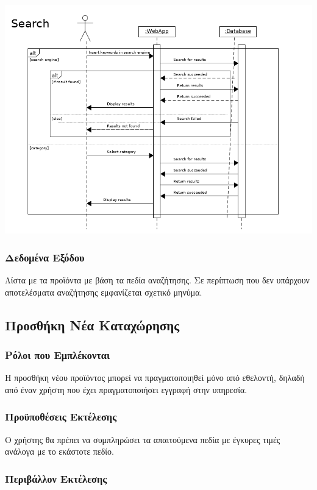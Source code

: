 \documentclass[12pt]{article}
\begin{document}
\begin{center}
\includegraphics[scale=0.5]{UML/searchSequence.png}
\end{center}

\subsubsection{Δεδομένα Εξόδου}

Λίστα με τα προϊόντα με βάση τα πεδία αναζήτησης. Σε περίπτωση που δεν υπάρχουν αποτελέσματα αναζήτησης εμφανίζεται σχετικό μηνύμα.


\subsection{Προσθήκη Νέα Καταχώρησης}


\subsubsection{Ρόλοι που Εμπλέκονται}

Η προσθήκη νέου προϊόντος μπορεί να πραγματοποιηθεί μόνο από εθελοντή, δηλαδή από έναν χρήστη που έχει πραγματοποιήσει εγγραφή στην υπηρεσία.

\subsubsection{Προϋποθέσεις Εκτέλεσης}

Ο χρήστης θα πρέπει να συμπληρώσει τα απαιτούμενα πεδία με έγκυρες τιμές ανάλογα με το εκάστοτε πεδίο. 

\subsubsection{Περιβάλλον Εκτέλεσης}
\end{document}
